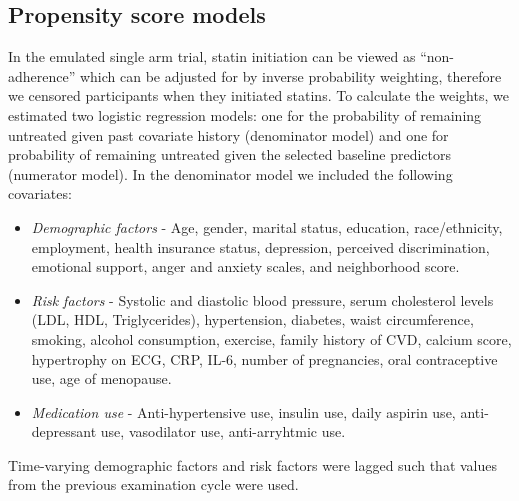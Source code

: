 \subsection{Propensity score models}
In the emulated single arm trial, statin initiation can be viewed as ``non-adherence'' which can be adjusted for by inverse probability weighting, therefore we censored participants when they initiated statins. To calculate the weights, we estimated two logistic regression models: one for the probability of remaining untreated given past covariate history (denominator model) and one for probability of remaining untreated given the selected baseline predictors (numerator model). In the denominator model we included the following covariates:
\begin{itemize}
    \item \textit{Demographic factors} - Age, gender, marital status, education, race/ethnicity, employment, health insurance status, depression, perceived discrimination, emotional support, anger and anxiety scales, and neighborhood score.
    \item \textit{Risk factors} - Systolic and diastolic blood pressure, serum cholesterol levels (LDL, HDL, Triglycerides), hypertension, diabetes, waist circumference, smoking, alcohol consumption, exercise, family history of CVD, calcium score, hypertrophy on ECG, CRP, IL-6, number of pregnancies, oral contraceptive use, age of menopause.
    \item \textit{Medication use} - Anti-hypertensive use, insulin use, daily aspirin use, anti-depressant use, vasodilator use, anti-arryhtmic use. 
\end{itemize}
Time-varying demographic factors and risk factors were lagged such that values from the previous examination cycle were used. 

